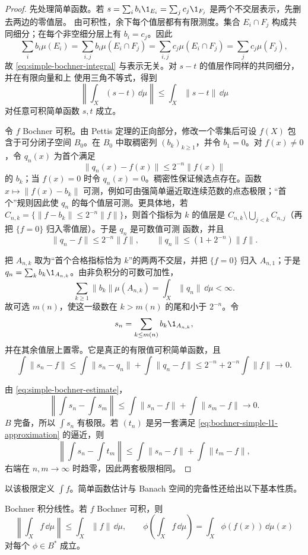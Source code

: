 \begin{proof}
先处理简单函数。若
$s=\sum_i b_i\1_{E_i}=\sum_jc_j\1_{F_j}$ 是两个不交层表示，先删去两边的零值层。
由可积性，余下每个值层都有有限测度。集合
$E_i\cap F_j$ 构成共同细分；在每个非空细分层上有 $b_i=c_j$。因此
\[
 \sum_i b_i\mu(E_i)
 =\sum_{i,j}b_i\mu(E_i\cap F_j)
 =\sum_{i,j}c_j\mu(E_i\cap F_j)
 =\sum_jc_j\mu(F_j),
\]
故
\eqref{eq:simple-bochner-integral} 与表示无关。对 $s-t$ 的值层作同样的共同细分，并在有限向量和上
使用三角不等式，得到
\[
 \left\|\int_X(s-t)\,\dd\mu\right\|
 \le\int_X\|s-t\|\,\dd\mu
 \tag{3.4.11}\label{eq:simple-bochner-estimate}
\]
对任意可积简单函数 $s,t$ 成立。

令 $f$ Bochner 可积。由 Pettis 定理的正向部分，修改一个零集后可设 $f(X)$ 包含于可分闭子空间
$B_0$。在 $B_0$ 中取稠密列 $(b_k)_{k\ge1}$，并令 $b_1=0$。对 $f(x)\ne0$，令 $q_n(x)$ 为首个满足
\[
  \|q_n(x)-f(x)\|\le2^{-n}\|f(x)\|
  \tag{3.4.12}\label{eq:relative-countable-approximation}
\]
的 $b_k$；当 $f(x)=0$ 时令 $q_n(x)=0$。稠密性保证候选点存在。函数
$x\mapsto\|f(x)-b_k\|$ 可测，例如可由强简单逼近取连续范数的点态极限；“首个”规则因此使
$q_n$ 的每个值层可测。更具体地，若
$C_{n,k}=\{\|f-b_k\|\le2^{-n}\|f\|\}$，则首个指标为 $k$ 的值层是
$C_{n,k}\setminus\bigcup_{j<k}C_{n,j}$（再把 $\{f=0\}$ 归入零值层）。于是 $q_n$ 是可数值可测
函数，并且
\[
 \|q_n-f\|\le2^{-n}\|f\|,
 \qquad \|q_n\|\le(1+2^{-n})\|f\|.
\]

把 $A_{n,k}$ 取为“首个合格指标恰为 $k$”的两两不交层，并把 $\{f=0\}$ 归入 $A_{n,1}$；于是
$q_n=\sum_kb_k\1_{A_{n,k}}$。由非负积分的可数可加性，
\[
 \sum_{k\ge1}\|b_k\|\mu(A_{n,k})=\int_X\|q_n\|\,\dd\mu<\infty.
\]
故可选 $m(n)$，使这一级数在 $k>m(n)$ 的尾和小于 $2^{-n}$。令
\[
 s_n=\sum_{k\le m(n)}b_k\1_{A_{n,k}},
\]
并在其余值层上置零。它是真正的有限值可积简单函数，且
\[
 \int\|s_n-f\|
 \le\int\|s_n-q_n\|+\int\|q_n-f\|
 \le2^{-n}+2^{-n}\int\|f\|\longrightarrow0.
\]

由 \eqref{eq:simple-bochner-estimate}，
\[
 \left\|\int s_n-\int s_m\right\|
 \le\int\|s_n-f\|+\int\|s_m-f\|\longrightarrow0.
\]
$B$ 完备，所以 $\int s_n$ 有极限。若 $(t_n)$ 是另一套满足
\eqref{eq:bochner-simple-l1-approximation} 的逼近，则
\[
 \left\|\int s_n-\int t_m\right\|
 \le\int\|s_n-f\|+\int\|t_m-f\|,
\]
右端在 $n,m\to\infty$ 时趋零，因此两套极限相同。
\end{proof}

以该极限定义 $\int f$。简单函数估计与 Banach 空间的完备性还给出以下基本性质。

\begin{theorem}\label{theorem:3-4-2-2}
Bochner 积分线性。若 $f$ Bochner 可积，则
\[
 \left\|\int_Xf\,\dd\mu\right\|
 \le\int_X\|f\|\,\dd\mu,
 \qquad
 \phi\!\left(\int_Xf\,\dd\mu\right)
 =\int_X\phi(f(x))\,\dd\mu(x)
 \tag{3.4.13}\label{eq:bochner-basic-estimates}
\]
对每个 $\phi\in B^*$ 成立。
\end{theorem}

